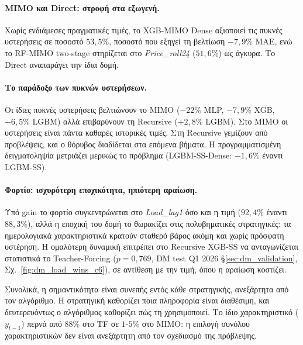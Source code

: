 \paragraph*{MIMO και Direct: στροφή στα εξωγενή.}
Χωρίς ενδιάμεσες πραγματικές τιμές, το XGB-MIMO Dense αξιοποιεί τις πυκνές
υστερήσεις σε ποσοστό $53{,}5\%$, ποσοστό που εξηγεί τη βελτίωση $-7{,}9\%$ MAE,
ενώ το RF-MIMO two-stage στηρίζεται στο \textit{Price\_roll24} ($51{,}6\%$) ως
άγκυρα. Το Direct αναπαράγει την ίδια δομή.

\paragraph*{Το παράδοξο των πυκνών υστερήσεων.}
Οι ίδιες πυκνές υστερήσεις βελτιώνουν το MIMO ($-22\%$ MLP, $-7{,}9\%$ XGB,
$-6{,}5\%$ LGBM) αλλά επιβαρύνουν τη Recursive ($+2{,}8\%$ LGBM). Στο MIMO οι
υστερήσεις είναι πάντα καθαρές ιστορικές τιμές. Στη Recursive γεμίζουν από
προβλέψεις, και ο θόρυβος διαδίδεται στα επόμενα βήματα. Η προγραμματισμένη
δειγματοληψία μετριάζει μερικώς το πρόβλημα (LGBM-SS-Dense: $-1{,}6\%$ έναντι
LGBM-SS).

\paragraph*{Φορτίο: ισχυρότερη εποχικότητα, ηπιότερη αραίωση.}
Υπό gain το φορτίο συγκεντρώνεται στο \textit{Load\_lag1} όσο και η τιμή
($92{,}4\%$ έναντι $88{,}3\%$), αλλά η εποχική του δομή το θωρακίζει στις
πολυβηματικές στρατηγικές: τα ημερολογιακά χαρακτηριστικά κρατούν σταθερό βάρος
ακόμη και χωρίς πρόσφατη υστέρηση. Η ομαλότερη δυναμική επιτρέπει στο Recursive
XGB-SS να ανταγωνίζεται στατιστικά το Teacher-Forcing ($p = 0{,}769$, DM test
Q1 2026 §\ref{sec:dm_validation}, Σχ.~\ref{fig:dm_load_wins_c6}), σε αντίθεση με την
τιμή, όπου η αραίωση κοστίζει.

Συνολικά, η σημαντικότητα είναι συνεπής εντός κάθε στρατηγικής, ανεξάρτητα από
τον αλγόριθμο. Η στρατηγική καθορίζει ποια πληροφορία είναι διαθέσιμη, και
δευτερευόντως ο αλγόριθμος καθορίζει πώς τη χρησιμοποιεί. Το ίδιο χαρακτηριστικό
($y_{t-1}$) περνά από $88\%$ στο TF σε $1$-$5\%$ στο MIMO: η επιλογή συνόλου
χαρακτηριστικών δεν είναι ανεξάρτητη από τον σχεδιασμό της πρόβλεψης.


